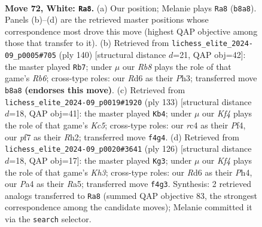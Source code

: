 \documentclass[11pt]{article}
\begin{document}
\clearpage

\begin{figure}[p]\centering
\begin{subfigure}{0.46\textwidth}\centering
\resizebox{\linewidth}{!}{%
\newchessgame
\chessboard[
  setfen={1R6/5p2/3Rp1k1/8/P1r1PK2/5P2/8/8 w - - 35 72},
  showmover=false,
  pgfstyle=straightmove, color=movearrow, markmove={b8-a8}
]}
\caption{}
\end{subfigure}\hfill
\begin{subfigure}{0.46\textwidth}\centering
\resizebox{\linewidth}{!}{%
\newchessgame
\chessboard[
  setfen={8/8/1R6/5pp1/p3k3/P6P/1P1r1PK1/8 w - - 65 71},
  showmover=false,
  pgfstyle=straightmove, color=movearrow, markmove={b6-b7}
]}
\caption{}
\end{subfigure}
\\[4pt]
\begin{subfigure}{0.46\textwidth}\centering
\resizebox{\linewidth}{!}{%
\newchessgame
\chessboard[
  setfen={8/8/2R2p2/2p5/2k1Pp2/1p3P2/7r/2K5 b - - 3 67},
  showmover=false,
  pgfstyle=straightmove, color=movearrow, markmove={c4-b4}
]}
\caption{}
\end{subfigure}\hfill
\begin{subfigure}{0.46\textwidth}\centering
\resizebox{\linewidth}{!}{%
\newchessgame
\chessboard[
  setfen={8/8/5kp1/R6p/7P/2r2P1K/6P1/8 w - - 24 64},
  showmover=false,
  pgfstyle=straightmove, color=movearrow, markmove={h3-g3}
]}
\caption{}
\end{subfigure}
\caption{\textbf{Move 72, White: \texttt{Ra8}.} (a) Our position; Melanie plays \texttt{Ra8} (\texttt{b8a8}). Panels (b)--(d) are the retrieved master positions whose correspondence most drove this move (highest QAP objective among those that transfer to it). (b) Retrieved from \texttt{lichess\_elite\_2024-09\_p0005\#705} (ply 140) [structural distance $d$=21, QAP obj=42]: the master played \texttt{Rb7}; under $\mu$ our \emph{Rb8} plays the role of that game's \emph{Rb6}; cross-type roles: our \emph{R}d6 as their \emph{P}h3; transferred move \texttt{b8a8} \textbf{(endorses this move)}. (c) Retrieved from \texttt{lichess\_elite\_2024-09\_p0019\#1920} (ply 133) [structural distance $d$=18, QAP obj=41]: the master played \texttt{Kb4}; under $\mu$ our \emph{Kf4} plays the role of that game's \emph{Kc5}; cross-type roles: our \emph{r}c4 as their \emph{P}f4, our \emph{p}f7 as their \emph{R}h2; transferred move \texttt{f4g4}. (d) Retrieved from \texttt{lichess\_elite\_2024-09\_p0020\#3641} (ply 126) [structural distance $d$=18, QAP obj=17]: the master played \texttt{Kg3}; under $\mu$ our \emph{Kf4} plays the role of that game's \emph{Kh3}; cross-type roles: our \emph{R}d6 as their \emph{P}h4, our \emph{P}a4 as their \emph{R}a5; transferred move \texttt{f4g3}. Synthesis: 2 retrieved analogs transferred to \texttt{Ra8} (summed QAP objective 83, the strongest correspondence among the candidate moves); Melanie committed it via the \texttt{search} selector.}
\label{fig:thought-m142}
\end{figure}
\end{document}
